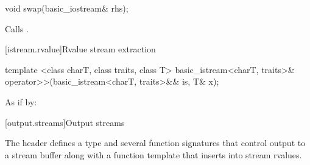 %
%
\begin{itemdecl}
void swap(basic_iostream& rhs);
\end{itemdecl}

\begin{itemdescr}
\pnum
\effects Calls .
\end{itemdescr}

[istream.rvalue]{Rvalue stream extraction}

%
%
\begin{itemdecl}
template <class charT, class traits, class T>
  basic_istream<charT, traits>&
  operator>>(basic_istream<charT, traits>&& is, T& x);
\end{itemdecl}

\begin{itemdescr}
\pnum
\effects As if by: 

\pnum
\returns {}
\end{itemdescr}


[output.streams]{Output streams}

\pnum
The header
defines a type
and several function signatures that control output to a
stream buffer along with a function template that inserts into stream rvalues.

